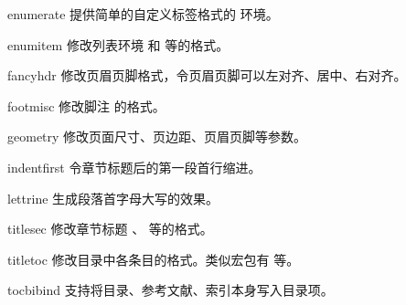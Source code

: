 \begin{pkglist}
  \item[enumerate]   提供简单的自定义标签格式的  环境。
  \item[enumitem]    修改列表环境  和  等的格式。
  \item[fancyhdr]    修改页眉页脚格式，令页眉页脚可以左对齐、居中、右对齐。
  \item[footmisc]    修改脚注  的格式。
  \item[geometry]    修改页面尺寸、页边距、页眉页脚等参数。
  \item[indentfirst] 令章节标题后的第一段首行缩进。
  \item[lettrine]    生成段落首字母大写的效果。
  \item[titlesec]    修改章节标题 、 等的格式。
  \item[titletoc]    修改目录中各条目的格式。类似宏包有  等。
  \item[tocbibind]   支持将目录、参考文献、索引本身写入目录项。
\end{pkglist}

\endinput
